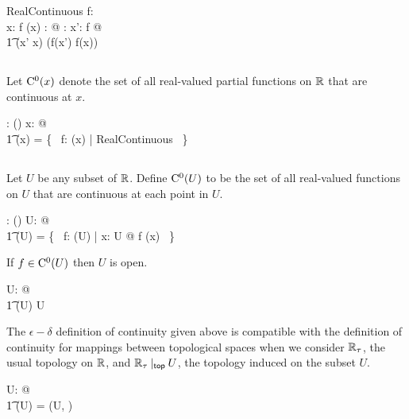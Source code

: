 \documentclass[11pt, oneside]{article}
\begin{document}
\begin{schema}{RealContinuous}
	f: \R \pfun \R \\
	x: \R
\where
	f \in \FunR(x)
\also
	\forall \epsilon: \Rpos @ \exists \delta: \Rpos@ \forall x': \dom f @ \\
	\t1	\absR(x' \subR x) \ltR \delta \implies \absR(f(x') \subR f(x)) \ltR \epsilon
\end{schema}

\subsection{}

Let $\operatorname{C^0}(x)$ denote the set of all real-valued partial functions on $\mathbb{R}$ that are continuous at $x$.
\begin{axdef}
	\CzeroR: \R \fun \power(\R \pfun \R)
\where
	\forall x: \R @ \\
	\t1	\CzeroR(x) = \{~ f: \FunR(x) | RealContinuous ~\}
\end{axdef}

\subsection{}

Let $U$ be any subset of $\mathbb{R}$. 
Define $\operatorname{C^0}(U)$ to be the set of all real-valued functions on $U$ that are continuous at each point in $U$.

\begin{axdef}
	\CzeroPR: \power \R \fun \power (\R \pfun \R)
\where
	\forall U: \power \R @ \\
	\t1	\CzeroPR(U) = \{~ f: \FunPR(U) | \forall x: U @ f \in   \CzeroR(x) ~\}
\end{axdef}

\begin{remark}
If $f \in \operatorname{C^0}(U)$ then $U$ is open.

\begin{zed}
	\forall U: \power \R @ \\
	\t1	\CzeroPR(U) \neq \emptyset \implies U \in \openR
\end{zed}

\end{remark}

\begin{remark}
The $\epsilon-\delta$ definition of continuity given above is compatible with the definition
of continuity for mappings between topological spaces when we consider $\mathbb{R}_\tau$, the usual topology on $\mathbb{R}$,
and $\mathbb{R}_\tau \mathbin{|_{\mathsf{top}}} U$, the topology induced on the subset $U$.

\begin{zed}
	\forall U: \openR @ \\
	\t1	\CzeroPR(U) = \CzeroTT(\Rtau \inducedTopSp U, \Rtau)
\end{zed}

\end{remark}
\end{document}
